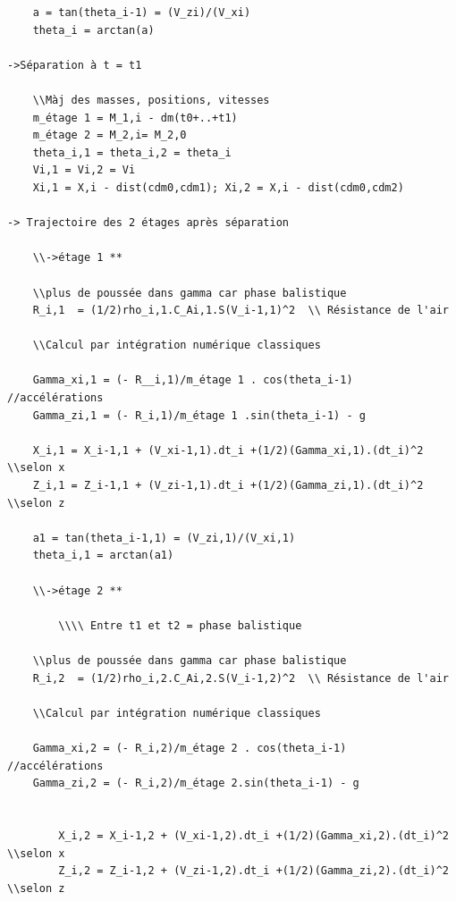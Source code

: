 \documentclass[a4paper]{article}
\begin{document}
\begin{verbatim}
	a = tan(theta_i-1) = (V_zi)/(V_xi)
	theta_i = arctan(a)

->Séparation à t = t1

	\\Màj des masses, positions, vitesses
	m_étage 1 = M_1,i - dm(t0+..+t1)
	m_étage 2 = M_2,i= M_2,0	
	theta_i,1 = theta_i,2 = theta_i
	Vi,1 = Vi,2 = Vi
	Xi,1 = X,i - dist(cdm0,cdm1); Xi,2 = X,i - dist(cdm0,cdm2)

-> Trajectoire des 2 étages après séparation 

	\\->étage 1 **
	
	\\plus de poussée dans gamma car phase balistique
	R_i,1  = (1/2)rho_i,1.C_Ai,1.S(V_i-1,1)^2  \\ Résistance de l'air

	\\Calcul par intégration numérique classiques

	Gamma_xi,1 = (- R__i,1)/m_étage 1 . cos(theta_i-1)		//accélérations
	Gamma_zi,1 = (- R_i,1)/m_étage 1 .sin(theta_i-1) - g

	X_i,1 = X_i-1,1 + (V_xi-1,1).dt_i +(1/2)(Gamma_xi,1).(dt_i)^2	\\selon x
	Z_i,1 = Z_i-1,1 + (V_zi-1,1).dt_i +(1/2)(Gamma_zi,1).(dt_i)^2	\\selon z

	a1 = tan(theta_i-1,1) = (V_zi,1)/(V_xi,1)
	theta_i,1 = arctan(a1)

	\\->étage 2 **
	
		\\\\ Entre t1 et t2 = phase balistique

	\\plus de poussée dans gamma car phase balistique
	R_i,2  = (1/2)rho_i,2.C_Ai,2.S(V_i-1,2)^2  \\ Résistance de l'air

	\\Calcul par intégration numérique classiques

	Gamma_xi,2 = (- R_i,2)/m_étage 2 . cos(theta_i-1)		//accélérations
	Gamma_zi,2 = (- R_i,2)/m_étage 2.sin(theta_i-1) - g
	
	
		X_i,2 = X_i-1,2 + (V_xi-1,2).dt_i +(1/2)(Gamma_xi,2).(dt_i)^2	\\selon x
		Z_i,2 = Z_i-1,2 + (V_zi-1,2).dt_i +(1/2)(Gamma_zi,2).(dt_i)^2	\\selon z


\end{verbatim}
\end{document}
